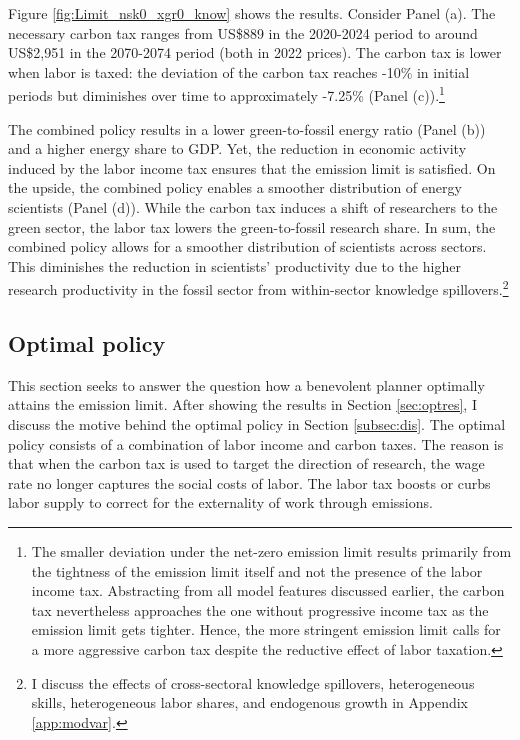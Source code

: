 
Figure \ref{fig:Limit_nsk0_xgr0_know} shows the results.
Consider Panel (a). The necessary carbon tax ranges from US\$889  in the 2020-2024 period to around US\$2,951 in the 2070-2074 period (both in 2022 prices). The carbon tax is lower when labor is taxed: the deviation of the carbon tax reaches -10\% in initial periods but diminishes over time to approximately -7.25\% (Panel (c)).\footnote{ The smaller deviation under the net-zero emission limit results primarily from the tightness of the emission limit itself and not the presence of the labor income tax. Abstracting from all model features discussed earlier, the carbon tax nevertheless approaches the one without progressive income tax as the emission limit gets tighter. Hence, the more stringent emission limit calls for a more aggressive carbon tax despite the reductive effect of labor taxation.}

The combined policy results in a lower green-to-fossil energy ratio (Panel (b)) and a higher energy share to GDP. Yet, the reduction in economic activity induced by the labor income tax ensures that the emission limit is satisfied. On the upside, the combined policy enables a smoother distribution of energy scientists (Panel (d)). While the carbon tax induces a shift of researchers to the green sector, the labor tax lowers the green-to-fossil research share. 
In sum, the combined policy allows for a smoother distribution of scientists across sectors. This diminishes the reduction in scientists' productivity due to the higher research productivity in the fossil sector from within-sector knowledge spillovers.\footnote{ I discuss the effects of cross-sectoral knowledge spillovers, heterogeneous skills, heterogeneous labor shares, and endogenous growth in Appendix \ref{app:modvar}. }



\subsection{Optimal policy}\label{subsec:mr}


This section seeks to answer the question how a benevolent planner optimally attains the emission limit. After showing the results in Section \ref{sec:optres}, I discuss the motive behind the optimal policy in Section \ref{subsec:dis}. The optimal policy consists of a combination of labor income and carbon taxes. The reason is that when the carbon tax is used to target the direction of research, the wage rate no longer captures the social costs of labor. The labor tax boosts or curbs labor supply to correct for the externality of work through emissions. 

